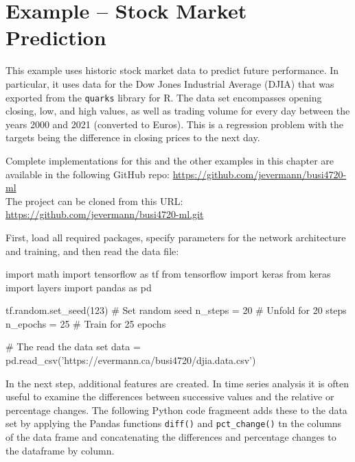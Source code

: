 \section{Example -- Stock Market Prediction}

This example uses historic stock market data to predict future performance. In particular, it uses data for the Dow Jones Industrial Average (DJIA) that was exported from the \texttt{quarks} library for R. The data set encompasses opening closing, low, and high values, as well as trading volume for every day between the years 2000 and 2021 (converted to Euros). This is a regression problem with the targets being the difference in closing prices to the next day.

\begin{tcolorbox}[colback=code]
\footnotesize
Complete implementations for this and the other examples in this chapter are available in the following GitHub repo:
\url{https://github.com/jevermann/busi4720-ml} \\

The project can be cloned from this URL: \url{https://github.com/jevermann/busi4720-ml.git}
\normalsize
\end{tcolorbox}

First, load all required packages, specify parameters for the network architecture and training, and then read the data file:

\begin{samepage}
\begin{pythoncode}
import math
import tensorflow as tf
from tensorflow import keras
from keras import layers
import pandas as pd

tf.random.set_seed(123)   # Set random seed
n_steps = 20              # Unfold for 20 steps
n_epochs = 25             # Train for 25 epochs

# The read the data set
data = pd.read_csv('https://evermann.ca/busi4720/djia.data.csv')
\end{pythoncode}
\end{samepage}

In the next step, additional features are created. In time series analysis it is often useful to examine the differences between successive values and the relative or percentage changes. The following Python code fragmeent adds these to the data set by applying the Pandas functions \texttt{diff()} and \texttt{pct\_change()} tn the columns of the data frame and concatenating the differences and percentage changes to the dataframe by column.

